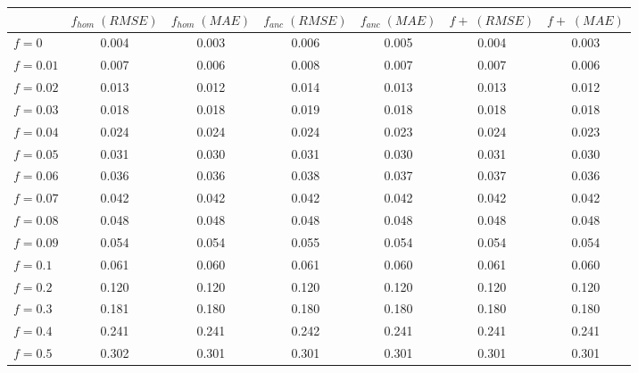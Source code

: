 \begin{tabular}{lcccccc}
\toprule
 & $f_{hom}\;(RMSE)$ & $f_{hom}\;(MAE)$ & $f_{anc}\;(RMSE)$ & $f_{anc}\;(MAE)$ & $f+\;(RMSE)$ & $f+\;(MAE)$ \\
\midrule
$f = 0$ & 0.004 & 0.003 & 0.006 & 0.005 & 0.004 & 0.003 \\
$f = 0.01$ & 0.007 & 0.006 & 0.008 & 0.007 & 0.007 & 0.006 \\
$f = 0.02$ & 0.013 & 0.012 & 0.014 & 0.013 & 0.013 & 0.012 \\
$f = 0.03$ & 0.018 & 0.018 & 0.019 & 0.018 & 0.018 & 0.018 \\
$f = 0.04$ & 0.024 & 0.024 & 0.024 & 0.023 & 0.024 & 0.023 \\
$f = 0.05$ & 0.031 & 0.030 & 0.031 & 0.030 & 0.031 & 0.030 \\
$f = 0.06$ & 0.036 & 0.036 & 0.038 & 0.037 & 0.037 & 0.036 \\
$f = 0.07$ & 0.042 & 0.042 & 0.042 & 0.042 & 0.042 & 0.042 \\
$f = 0.08$ & 0.048 & 0.048 & 0.048 & 0.048 & 0.048 & 0.048 \\
$f = 0.09$ & 0.054 & 0.054 & 0.055 & 0.054 & 0.054 & 0.054 \\
$f = 0.1$ & 0.061 & 0.060 & 0.061 & 0.060 & 0.061 & 0.060 \\
$f = 0.2$ & 0.120 & 0.120 & 0.120 & 0.120 & 0.120 & 0.120 \\
$f = 0.3$ & 0.181 & 0.180 & 0.180 & 0.180 & 0.180 & 0.180 \\
$f = 0.4$ & 0.241 & 0.241 & 0.242 & 0.241 & 0.241 & 0.241 \\
$f = 0.5$ & 0.302 & 0.301 & 0.301 & 0.301 & 0.301 & 0.301 \\
\bottomrule
\end{tabular}
